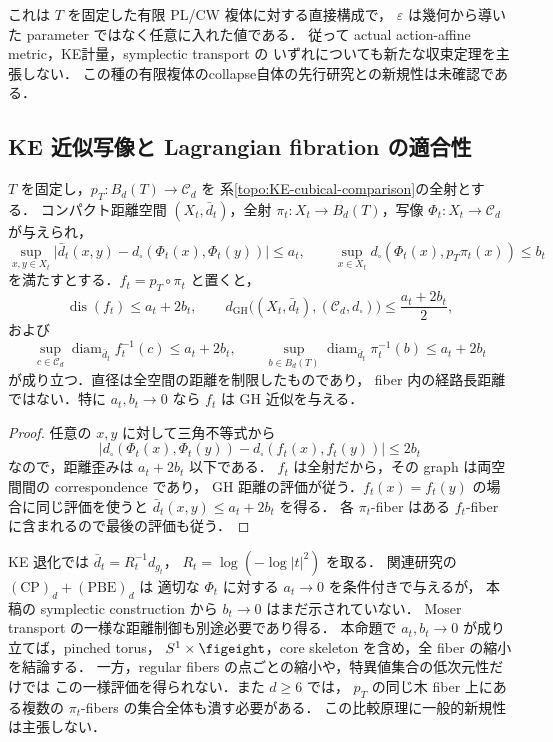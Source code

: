\begin{remark}[計量収縮の範囲と新規性]
これは $T$ を固定した有限 PL/CW 複体に対する直接構成で，
$\varepsilon$ は幾何から導いた parameter ではなく任意に入れた値である．
従って actual action-affine metric，KE計量，symplectic transport の
いずれについても新たな収束定理を主張しない．
この種の有限複体のcollapse自体の先行研究との新規性は未確認である．
\end{remark}

\subsection{KE 近似写像と Lagrangian fibration の適合性}

\begin{proposition}
\label{topo:ke-map-compatibility}
$T$ を固定し，$p_T:B_d(T)\to\mathcal C_d$ を
系\ref{topo:KE-cubical-comparison}の全射とする．
コンパクト距離空間 $(X_t,\bar d_t)$，全射
$\pi_t:X_t\to B_d(T)$，写像 $\Phi_t:X_t\to\mathcal C_d$ が与えられ，
\[
 \sup_{x,y\in X_t}
 \bigl|\bar d_t(x,y)-d_\square(\Phi_t(x),\Phi_t(y))\bigr|\le a_t,
 \qquad
 \sup_{x\in X_t}d_\square(\Phi_t(x),p_T\pi_t(x))\le b_t
\]
を満たすとする．$f_t=p_T\circ\pi_t$ と置くと，
\[
 \operatorname{dis}(f_t)\le a_t+2b_t,\qquad
 d_{\mathrm{GH}}\bigl((X_t,\bar d_t),(\mathcal C_d,d_\square)\bigr)
 \le \frac{a_t+2b_t}{2},
\]
および
\[
 \sup_{c\in\mathcal C_d}\operatorname{diam}_{\bar d_t}f_t^{-1}(c)
 \le a_t+2b_t,\qquad
 \sup_{b\in B_d(T)}\operatorname{diam}_{\bar d_t}\pi_t^{-1}(b)
 \le a_t+2b_t
\]
が成り立つ．直径は全空間の距離を制限したものであり，
fiber 内の経路長距離ではない．特に $a_t,b_t\to0$ なら $f_t$ は GH 近似を与える．
\end{proposition}
\begin{proof}
任意の $x,y$ に対して三角不等式から
\[
 \bigl|d_\square(\Phi_t(x),\Phi_t(y))
       -d_\square(f_t(x),f_t(y))\bigr|\le2b_t
\]
なので，距離歪みは $a_t+2b_t$ 以下である．
$f_t$ は全射だから，その graph は両空間間の correspondence であり，
GH 距離の評価が従う．$f_t(x)=f_t(y)$ の場合に同じ評価を使うと
$\bar d_t(x,y)\le a_t+2b_t$ を得る．
各 $\pi_t$-fiber はある $f_t$-fiber に含まれるので最後の評価も従う．
\end{proof}

\begin{remark}
KE 退化では $\bar d_t=R_t^{-1}d_{g_t}$，
$R_t=\log(-\log|t|^2)$ を取る．
関連研究\cite{KECubicalCurrent}の $\mathrm{(CP)}_d+\mathrm{(PBE)}_d$ は
適切な $\Phi_t$ に対する $a_t\to0$ を条件付きで与えるが，
本稿の symplectic construction から $b_t\to0$ はまだ示されていない．
Moser transport の一様な距離制御も別途必要であり得る．
本命題で $a_t,b_t\to0$ が成り立てば，pinched torus，
$S^1\times\figeight$，core skeleton を含め，全 fiber の縮小を結論する．
一方，regular fibers の点ごとの縮小や，特異値集合の低次元性だけでは
この一様評価を得られない．また $d\ge6$ では，
$p_T$ の同じ木 fiber 上にある複数の $\pi_t$-fibers の集合全体も潰す必要がある．
この比較原理に一般的新規性は主張しない．
\end{remark}

